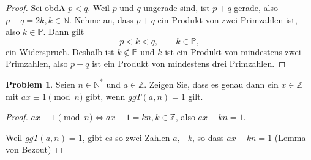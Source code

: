 \documentclass[prb,12pt]{revtex4-2}
\theoremstyle{definition}
\newtheorem{Problem}{Problem}
\theoremstyle{definition}
\newcommand{\N}{\mathbb{N}}
\newcommand{\Z}{\mathbb{Z}}
\begin{document}
\begin{proof}
	Sei obdA $p<q$. Weil $p$ und $q$ ungerade sind, ist $p+q$ gerade, also $p+q=2k, k\in \N$. Nehme an, dass $p+q$ ein Produkt von zwei Primzahlen ist, also $k\in \mathbb{P}$. Dann gilt
	\[
		p < k < q, \qquad k\in \mathbb{P}
	,\]
	ein Widerspruch. Deshalb ist $k\not\in \mathbb{P}$ und $k$ ist ein Produkt von mindestens zwei Primzahlen, also $p+q$ ist ein Produkt von mindestens drei Primzahlen. 
\end{proof}

\begin{Problem}
	Seien $n \in \N^*$ und $a \in \Z$. Zeigen Sie, dass es genau dann ein $x \in \Z$ mit $ax \equiv 1\pmod{n}$ gibt, wenn $ggT(a, n) = 1$ gilt.
\end{Problem}
\begin{proof}
	$ax\equiv 1\pmod{n}\iff ax-1=kn, k\in\Z$, also $ax-kn=1$.

	Weil $ggT(a,n)=1$, gibt es so zwei Zahlen $a, -k$, so dass $ax-kn=1$ (Lemma von Bezout)
\end{proof}
\end{document}
